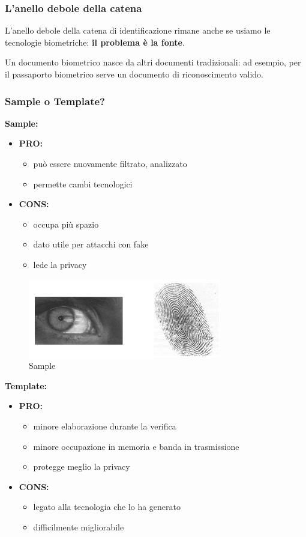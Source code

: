 \subsubsection{L'anello debole della catena}

L'anello debole della catena di identificazione rimane anche se usiamo le tecnologie biometriche: \textbf{il problema è la fonte}.

\noindent Un documento biometrico nasce da altri documenti tradizionali: ad esempio, per il passaporto biometrico serve un documento di riconoscimento valido.

\subsubsection{Sample o Template?}

\textbf{Sample:}
\begin{itemize}
    \item \textbf{PRO:}
    \begin{itemize}
        \item può essere nuovamente filtrato, analizzato
        \item permette cambi tecnologici
    \end{itemize}
    \item \textbf{CONS:}
    \begin{itemize}
        \item occupa più spazio
        \item dato utile per attacchi con fake
        \item lede la privacy
    \end{itemize}
\end{itemize}

\begin{figure}[h]
    \centering
    \includegraphics[width=0.5\linewidth]{chapters/images-chap1/sample.png}
    \caption{Sample}
    \label{fig:sample}
\end{figure}

\textbf{Template:}
\begin{itemize}
    \item \textbf{PRO:}
    \begin{itemize}
        \item minore elaborazione durante la verifica
        \item minore occupazione in memoria e banda in trasmissione
        \item protegge meglio la privacy
    \end{itemize}
    \item \textbf{CONS:}
    \begin{itemize}
        \item legato alla tecnologia che lo ha generato
        \item difficilmente migliorabile
    \end{itemize}
\end{itemize}

